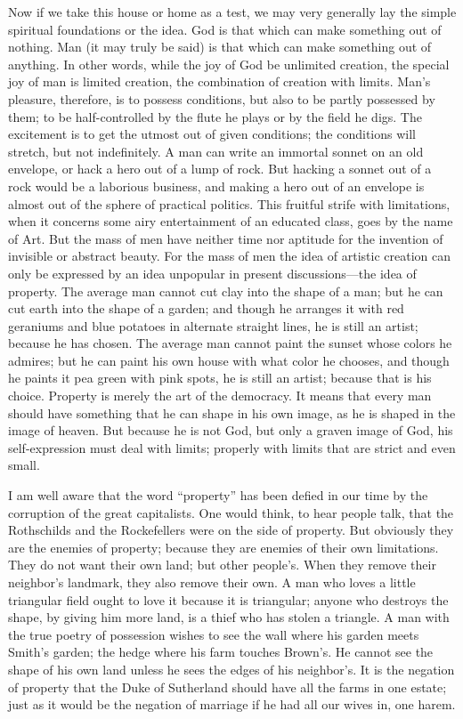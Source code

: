\documentclass{book}
\begin{document}
Now if we take this house or home as a test, we may very generally lay the simple spiritual foundations or the idea. God is that which can make something out of nothing. Man (it may truly be said) is that which can make something out of anything. In other words, while the joy of God be unlimited creation, the special joy of man is limited creation, the combination of creation with limits. Man’s pleasure, therefore, is to possess conditions, but also to be partly possessed by them; to be half-controlled by the flute he plays or by the field he digs. The excitement is to get the utmost out of given conditions; the conditions will stretch, but not indefinitely. A man can write an immortal sonnet on an old envelope, or hack a hero out of a lump of rock. But hacking a sonnet out of a rock would be a laborious business, and making a hero out of an envelope is almost out of the sphere of practical politics. This fruitful strife with limitations, when it concerns some airy entertainment of an educated class, goes by the name of Art. But the mass of men have neither time nor aptitude for the invention of invisible or abstract beauty. For the mass of men the idea of artistic creation can only be expressed by an idea unpopular in present discussions—the idea of property. The average man cannot cut clay into the shape of a man; but he can cut earth into the shape of a garden; and though he arranges it with red geraniums and blue potatoes in alternate straight lines, he is still an artist; because he has chosen. The average man cannot paint the sunset whose colors he admires; but he can paint his own house with what color he chooses, and though he paints it pea green with pink spots, he is still an artist; because that is his choice. Property is merely the art of the democracy. It means that every man should have something that he can shape in his own image, as he is shaped in the image of heaven. But because he is not God, but only a graven image of God, his self-expression must deal with limits; properly with limits that are strict and even small.

I am well aware that the word “property” has been defied in our time by the corruption of the great capitalists. One would think, to hear people talk, that the Rothschilds and the Rockefellers were on the side of property. But obviously they are the enemies of property; because they are enemies of their own limitations. They do not want their own land; but other people’s. When they remove their neighbor’s landmark, they also remove their own. A man who loves a little triangular field ought to love it because it is triangular; anyone who destroys the shape, by giving him more land, is a thief who has stolen a triangle. A man with the true poetry of possession wishes to see the wall where his garden meets Smith’s garden; the hedge where his farm touches Brown’s. He cannot see the shape of his own land unless he sees the edges of his neighbor’s. It is the negation of property that the Duke of Sutherland should have all the farms in one estate; just as it would be the negation of marriage if he had all our wives in, one harem.
\end{document}
